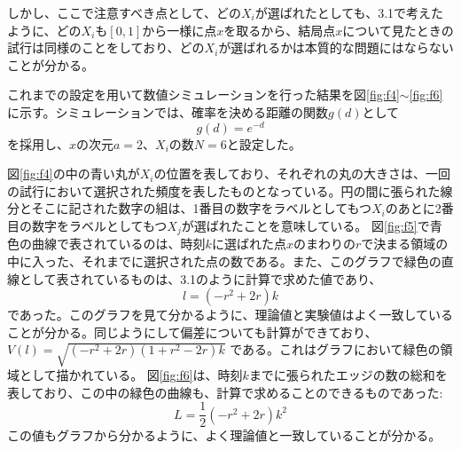 しかし、ここで注意すべき点として、どの$X_{i}$が選ばれたとしても、3.1で考えたように、どの$X_{i}$も$[0,1]$から一様に点$x$を取るから、結局点$x$について見たときの試行は同様のことをしており、どの$X_{i}$が選ばれるかは本質的な問題にはならないことが分かる。

これまでの設定を用いて数値シミュレーションを行った結果を図\ref{fig:f4}$\sim$\ref{fig:f6}に示す。シミュレーションでは、確率を決める距離の関数$g(d)$として
$$g(d) = e^{-d}$$
を採用し、$x$の次元$a=2$、$X_{i}$の数$N=6$と設定した。

図\ref{fig:f4}の中の青い丸が$X_{i}$の位置を表しており、それぞれの丸の大きさは、一回の試行において選択された頻度を表したものとなっている。円の間に張られた線分とそこに記された数字の組は、1番目の数字をラベルとしてもつ$X_{i}$のあとに2番目の数字をラベルとしてもつ$X_{j}$が選ばれたことを意味している。
図\ref{fig:f5}で青色の曲線で表されているのは、時刻$k$に選ばれた点$x$のまわりの$r$で決まる領域の中に入った、それまでに選択された点の数である。また、このグラフで緑色の直線として表されているものは、3.1のように計算で求めた値であり、
$$l = (-r^{2} + 2r)k$$
であった。このグラフを見て分かるように、理論値と実験値はよく一致していることが分かる。同じようにして偏差についても計算ができており、
$V(l) = \sqrt{(-r^{2} + 2r)(1+r^{2}-2r)k}$
である。これはグラフにおいて緑色の領域として描かれている。
図\ref{fig:f6}は、時刻$k$までに張られたエッジの数の総和を表しており、この中の緑色の曲線も、計算で求めることのできるものであった:
$$L = \frac{1}{2}(-r^{2} + 2r)k^{2}$$
この値もグラフから分かるように、よく理論値と一致していることが分かる。

